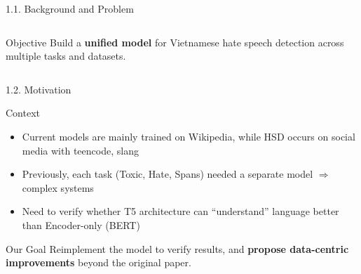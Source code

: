 \documentclass[11pt, aspectratio=169]{beamer}
\begin{document}
\begin{frame}[fragile, shrink=15]{1.1. Background and Problem}
\begin{columns}[T]
  \vspace{0.3cm}
  \begin{block}{Objective}
    Build a \textbf{unified model} for Vietnamese hate speech detection across multiple tasks and datasets.
  \end{block}
\end{columns}
\end{frame}

\begin{frame}{1.2. Motivation}
\scriptsize

\begin{block}{Context}
  \begin{itemize}
    \item Current models are mainly trained on Wikipedia, while HSD occurs on social media with teencode, slang
    \item Previously, each task (Toxic, Hate, Spans) needed a separate model $\Rightarrow$ complex systems
    \item Need to verify whether T5 architecture can ``understand'' language better than Encoder-only (BERT)
  \end{itemize}
\end{block}

\vspace{0.3cm}
\centering
\renewcommand{\arraystretch}{1.15}

\vspace{0.3cm}
\begin{block}{Our Goal}
  Reimplement the model to verify results, and \textbf{propose data-centric improvements} beyond the original paper.
\end{block}
\end{frame}
\end{document}

